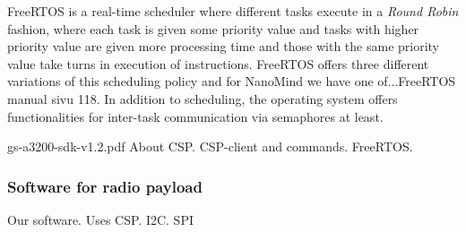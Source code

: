 \documentclass[english,12pt,a4paper,pdftex,elec,utf8]{aaltothesis}
\begin{document}
FreeRTOS is a real-time scheduler where different tasks execute in a \textit{Round Robin} fashion, where each task is given some priority value and tasks with higher priority value are given more processing time and those with the same priority value take turns in execution of instructions. FreeRTOS offers three different variations of this scheduling policy and for NanoMind we have one of...FreeRTOS manual sivu 118. In addition to scheduling, the operating system offers functionalities for inter-task communication via semaphores at least.\par 
gs-a3200-sdk-v1.2.pdf
About CSP. CSP-client and commands. FreeRTOS.\par
\subsubsection{Software for radio payload}
 Our software. Uses CSP. I2C. SPI\par
\end{document}

